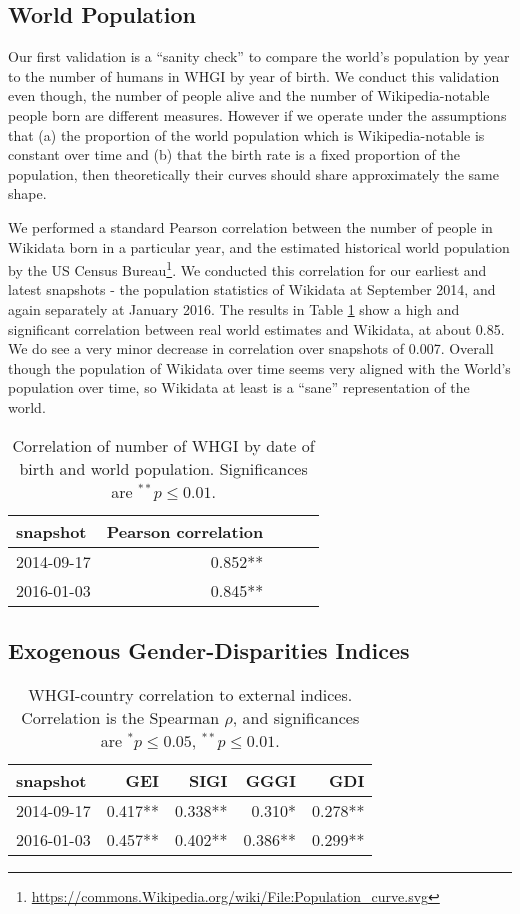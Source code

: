 \documentclass{sig-alternate-05-2015}
\begin{document}
\subsection{World Population} Our first validation is a ``sanity check'' to compare the world's population by year to the number of humans in WHGI by year of birth. We conduct this validation even though, the number of people alive and the number of Wikipedia-notable people born are different measures. However if we operate under the assumptions that (a) the proportion of the world population which is Wikipedia-notable is constant over time and (b) that the birth rate is a fixed proportion of the population, then theoretically their curves should share approximately the same shape.

We performed a standard Pearson correlation between the number of people in Wikidata born in a particular year, and the estimated historical world population by the US Census Bureau\footnote{\url{https://commons.Wikipedia.org/wiki/File:Population_curve.svg}}. We conducted this correlation for our earliest and latest snapshots - the population statistics of Wikidata at September 2014, and again separately at January 2016. The results in Table \ref{table:worldpop} show a high and significant correlation between real world estimates and Wikidata, at about 0.85. We do see a very minor decrease in correlation over snapshots of 0.007. Overall though the population of Wikidata over time seems very aligned with the World's population over time, so Wikidata at least is a ``sane'' representation of the world.

\begin{table}
\caption{Correlation of number of WHGI by date of birth and world population. Significances are $ ^{**}p\leq 0.01$.}
\label{table:worldpop}
\begin{tabular}{lrrrr}
\toprule
snapshot &  Pearson correlation \\
\midrule
2014-09-17 & 0.852**  \\
2016-01-03 & 0.845**  \\
\bottomrule
\end{tabular}
\end{table}

\subsection{Exogenous Gender-Disparities Indices}
\begin{table}
\caption{WHGI-country correlation to external indices. Correlation is the Spearman $\rho$, and significances are $ ^*p\leq 0.05 $, $ ^{**}p\leq 0.01$.}
\label{table:scores}
\begin{tabular}{lrrrr}
\toprule
snapshot &  GEI &  SIGI &  GGGI &  GDI  \\
\midrule
2014-09-17 &  0.417** &       0.338** &          0.310* &         0.278**  \\
2016-01-03 &  0.457** &       0.402** &          0.386** &         0.299**  \\
\bottomrule
\end{tabular}
\end{table}
\end{document}
